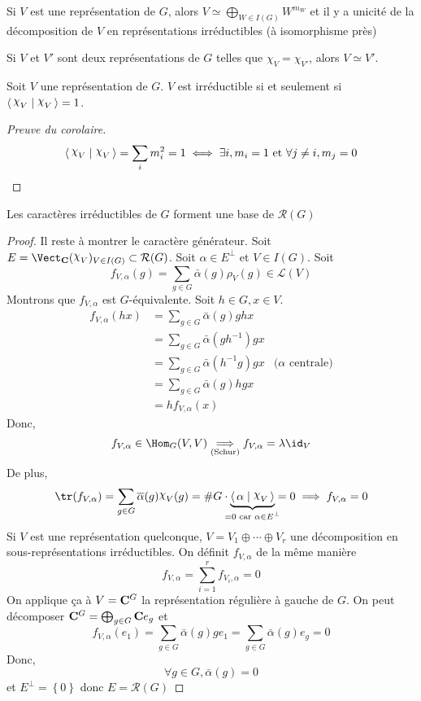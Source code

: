 \begin{cor}
    Si $V$ est une représentation de  $G$, alors  $V\simeq \bigoplus_{W \in  I(G)}W^{m_W}$ et il y a unicité de la décomposition de  $V$ en représentations irréductibles (à isomorphisme près)
\end{cor}

\begin{cor}
    Si $V$ et  $V'$ sont deux représentations de  $G$ telles que  $\chi_V=\chi_{V'}$, alors $V\simeq V'$.
\end{cor}

\begin{cor}
Soit $V$ une représentation de  $G$.  $V$ est irréductible  si et seulement si $\scalar{\chi_V}{\chi_V} =1$.
\end{cor}

\begin{proof}[Preuve du corolaire]
\[
    \scalar{\chi_V}{\chi_V} =\sum_i m_i^2=1 \iff  \exists  i, m_i=1\text{ et } \forall  j\neq i, m_j=0
\] 
\end{proof}

\begin{thm}
    Les caractères irréductibles de $G$ forment une base de $ \mathcal  R(G)$
\end{thm}

\begin{proof}
    Il reste à montrer le caractère générateur. Soit $E=\Vect_{\C} (\chi_V)_{V \in  I(G)}\subset \mathcal  R(G)$. Soit $\alpha \in  E^\bot$ et $V \in  I(G)$. Soit \[
        f_{V, \alpha}(g)=\sum_{g \in  G} \bar{\alpha}(g)\rho_V(g) \in  \mathcal  L(V)
    \] 
    Montrons que $f_{V, \alpha}$ est $G$-équivalente. Soit  $h \in  G, x \in  V$. 
    \begin{align*}
        f_{V, \alpha}(hx)&= \sum_{g \in  G}\bar{\alpha}(g) ghx\\&=\sum_{g \in  G}\bar{\alpha}(gh^{-1})gx\\&= \sum_{g \in  G}\bar\alpha(h^{-1}g)gx&\text{($\alpha$ centrale)}\\&=\sum_{g \in  G} \bar\alpha(g)hgx\\&=hf_{V,\alpha}(x)
    \end{align*}
    Donc, \[
        f_{V, \alpha} \in  \Hom_G(V,V) \underset{(\text{Schur})}\implies f_{V, \alpha}=\lambda \id_V
    \]
    De plus, \[
        \tr(f_{V, \alpha})=\sum_{g \in  G} \bar\alpha(g)\chi_V(g)=\#G \cdot \underbrace{\scalar{\alpha}{\chi_V} }_{\mathclap{=0 \text{ car }\alpha \in  E^\bot}}=0 \implies f_{V,\alpha}=0
    \]
    Si $V$ est une représentation quelconque,  $V=V_1\oplus\cdots \oplus V_r$ une décomposition en sous-représentations irréductibles. On définit $f_{V, \alpha}$ de la même manière \[
    f_{V, \alpha}=\sum_{i=1}^r f_{V_i,\alpha}=0
    \] 
    On applique ça à $V = \mathbf C^G$ la représentation régulière à gauche de $G$. On peut décomposer  $\mathbf C^G=\bigoplus_{g \in  G} \mathbf C e_g$ et \[
        f_{V, \alpha}(e_1) = \sum_{g \in  G} \bar\alpha(g) ge_1=\sum_{g \in  G}\bar\alpha(g)e_g=0
    \] 
    Donc, \[
        \forall  g \in  G, \bar\alpha(g)=0
    \] 
    et $E^\bot= \left\{ 0 \right\} $ donc $E = \mathcal  R(G)$
\end{proof}

